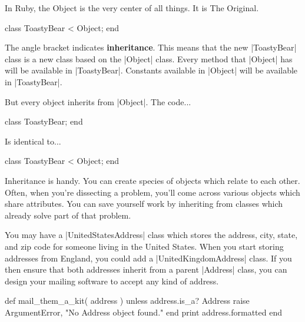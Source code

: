 \documentclass[12pt,twoside]{report}
\begin{document}
In Ruby, the Object is the very center of all things.  It is The
Original.


\begin{rubycode}

 class ToastyBear < Object; end

\end{rubycode}


The angle bracket indicates {\bf inheritance}.  This means that the
new \rubyinline|ToastyBear| class is a new class based
on the \rubyinline|Object| class.  Every method that
\rubyinline|Object| has will be available in
\rubyinline|ToastyBear|.  Constants available in
\rubyinline|Object| will be available in
\rubyinline|ToastyBear|.

But every object inherits from \rubyinline|Object|.
The code...


\begin{rubycode}

 class ToastyBear; end

\end{rubycode}


Is identical to...


\begin{rubycode}

 class ToastyBear < Object; end

\end{rubycode}


Inheritance is handy.  You can create species of objects which relate
to each other. Often, when you're dissecting a problem, you'll come
across various objects which share attributes.  You can save yourself
work by inheriting from classes which already solve part of that
problem.

You may have a \rubyinline|UnitedStatesAddress| class
which stores the address, city, state, and zip code for someone living
in the United States.  When you start storing addresses from England,
you could add a \rubyinline|UnitedKingdomAddress|
class.  If you then ensure that both addresses inherit from a parent
\rubyinline|Address| class, you can design your
mailing software to accept any kind of address.


\begin{rubycode}

 def mail_them_a_kit( address )
   unless address.is_a? Address
     raise ArgumentError, "No Address object found."
   end
   print address.formatted
 end

\end{rubycode}
\end{document}
